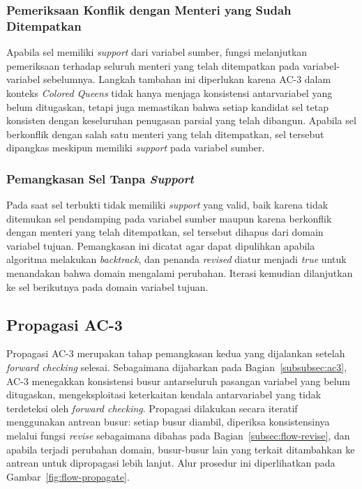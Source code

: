 \subsubsection{Pemeriksaan Konflik dengan Menteri yang Sudah Ditempatkan}

Apabila sel memiliki \textit{support} dari variabel sumber, fungsi melanjutkan pemeriksaan terhadap seluruh menteri yang telah ditempatkan pada variabel-variabel sebelumnya. Langkah tambahan ini diperlukan karena AC-3 dalam konteks \textit{Colored Queens} tidak hanya menjaga konsistensi antarvariabel yang belum ditugaskan, tetapi juga memastikan bahwa setiap kandidat sel tetap konsisten dengan keseluruhan penugasan parsial yang telah dibangun. Apabila sel berkonflik dengan salah satu menteri yang telah ditempatkan, sel tersebut dipangkas meskipun memiliki \textit{support} pada variabel sumber.

\subsubsection{Pemangkasan Sel Tanpa \textit{Support}}

Pada saat sel terbukti tidak memiliki \textit{support} yang valid, baik karena tidak ditemukan sel pendamping pada variabel sumber maupun karena berkonflik dengan menteri yang telah ditempatkan, sel tersebut dihapus dari domain variabel tujuan. Pemangkasan ini dicatat agar dapat dipulihkan apabila algoritma melakukan \textit{backtrack}, dan penanda \textit{revised} diatur menjadi \textit{true} untuk menandakan bahwa domain mengalami perubahan. Iterasi kemudian dilanjutkan ke sel berikutnya pada domain variabel tujuan.

\subsection{Propagasi AC-3}
\label{subsec:flow-propagate}

Propagasi AC-3 merupakan tahap pemangkasan kedua yang dijalankan setelah \textit{forward checking} selesai. Sebagaimana dijabarkan pada Bagian~\ref{subsubsec:ac3}, AC-3 menegakkan konsistensi busur antarseluruh pasangan variabel yang belum ditugaskan, mengeksploitasi keterkaitan kendala antarvariabel yang tidak terdeteksi oleh \textit{forward checking}. Propagasi dilakukan secara iteratif menggunakan antrean busur: setiap busur diambil, diperiksa konsistensinya melalui fungsi \textit{revise} sebagaimana dibahas pada Bagian~\ref{subsec:flow-revise}, dan apabila terjadi perubahan domain, busur-busur lain yang terkait ditambahkan ke antrean untuk dipropagasi lebih lanjut. Alur prosedur ini diperlihatkan pada Gambar~\ref{fig:flow-propagate}.

